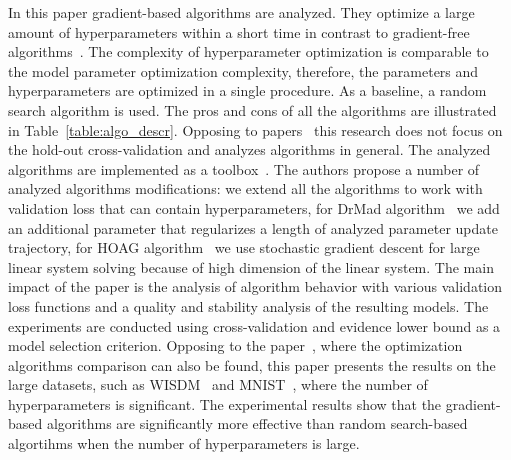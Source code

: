 \documentclass[smallcondensed]{svjour3}
\begin{document}
In this paper gradient-based algorithms are analyzed. They optimize a large amount of hyperparameters within a short time in contrast to gradient-free algorithms~\cite{hyper}.  The complexity of hyperparameter optimization is comparable to the model parameter optimization complexity, therefore, the parameters and hyperparameters are  optimized in a single procedure. As a baseline, a random search algorithm is used. The pros and cons of all the algorithms  
are illustrated in Table~\ref{table:algo_descr}. Opposing to papers~\cite{hyper_mad,hyper_hoag,hyper_greed} this research does not focus on the hold-out cross-validation and analyzes algorithms in general. The analyzed algorithms are implemented as a toolbox~\cite{pyfos}. The authors propose a number of analyzed algorithms modifications: we extend all the algorithms to work with validation loss that can contain hyperparameters, for DrMad algorithm~\cite{hyper_mad} we add an additional parameter that regularizes a length of analyzed parameter update trajectory, for HOAG algorithm~\cite{hyper_hoag} we use stochastic gradient descent for large linear system solving because of high dimension of the linear system.   The main impact of the paper is the analysis of algorithm behavior with various validation loss functions and a quality and stability analysis of the resulting models. The experiments are conducted using cross-validation and evidence lower bound as a model selection criterion. Opposing to the paper~\cite{hyper_hoag}, where  the optimization algorithms comparison can also be found, this paper presents the results on the large datasets, such as  WISDM~\cite{wisdm} and MNIST~\cite{mnist}, where the number of hyperparameters is significant. 
The experimental results show that the gradient-based algorithms are significantly more effective than random search-based algortihms when the number of hyperparameters is large. 
\end{document}
